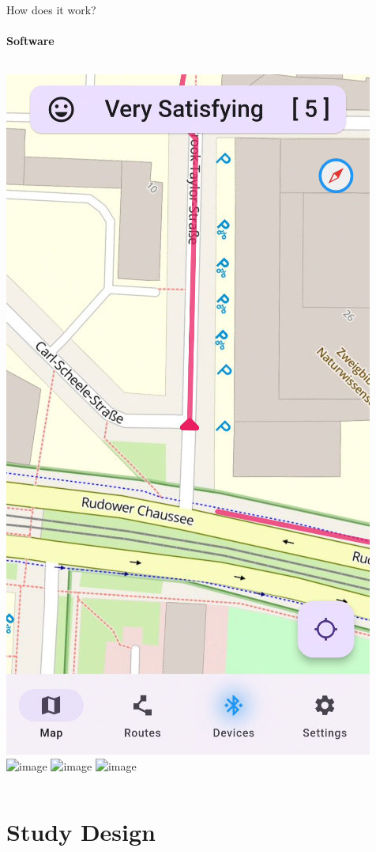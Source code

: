 \documentclass[
    english,
    accentcolor=9c,
    design=2023,
    logofile=images/hulogo.pdf,
]{tudabeamer}
\begin{document}
\begin{frame}{How does it work?}
    \framesubtitle{Software}
    \begin{columns}[onlytextwidth,c]
        \centering
        \includegraphics[height=1.35\linewidth]{../images/app_map_screen.jpg}
        \centering
        \includegraphics<2->[height=1.35\linewidth]{../images/app_routes_screen.jpg}
        \centering
        \includegraphics<3->[height=1.35\linewidth]{../images/app_devices_screen.jpg}
        \centering
        \includegraphics<4->[height=1.35\linewidth]{../images/app_tlx_survey.jpg}
    \end{columns}
\end{frame}

\section{Study Design}
\end{document}

